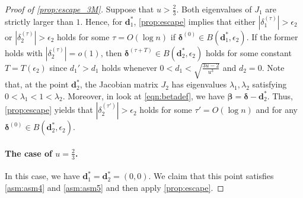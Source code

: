 \documentclass[letterpaper,11pt]{article}
\begin{document}
\begin{proof}[Proof of \cref{prop:escape_3M}]
Suppose that $u>\frac{2}{3}$.
Both eigenvalues of $J_1$ are strictly larger than $1$.
Hence, for $\mathbf{d}^*_1$, \cref{prop:escape} implies that either $|\delta_1^{(\tau)}|>\epsilon_2$ or $|\delta_2^{(\tau)}|>\epsilon_2$ holds for some $\tau=O(\log n)$ if ${\boldsymbol \delta}^{(0)} \in B(\mathbf{d}^*_1,\epsilon_2)$.
If the former holds with $|\delta_2^{(\tau)}|=o(1)$, then ${\boldsymbol \delta}^{(\tau+T)} \in B(\mathbf{d}^*_2,\epsilon_2)$ holds for some constant $T=T(\epsilon_2)$ since $d_1'>d_1$ holds whenever $0<d_1<\sqrt{\frac{3u-2}{u^3}}$ and $d_2=0$.
Note that, at the point $\mathbf{d}^*_2$, the Jacobian matrix $J_2$ has eigenvalues $\lambda_1,\lambda_2$ satisfying $0<\lambda_1<1<\lambda_2$.
Moreover, in look at \cref{eqn:betadef}, we have ${\boldsymbol \beta}={\boldsymbol \delta}-\mathbf{d}^*_2$.
Thus, \cref{prop:escape} yields that $|\delta_2^{(\tau')}|>\epsilon_2$ holds for some $\tau'=O(\log n)$ and for any ${\boldsymbol \delta}^{(0)} \in B(\mathbf{d}^*_2,\epsilon_2)$.

\paragraph*{The case of $u=\frac{2}{3}$.}
In this case, we have $\mathbf{d}^*_1=\mathbf{d}^*_2=(0,0)$.
We claim that this point satisfies \ref{asm:asm4} and \ref{asm:asm5} and then apply \cref{prop:escape}.


\end{proof}
\end{document}
